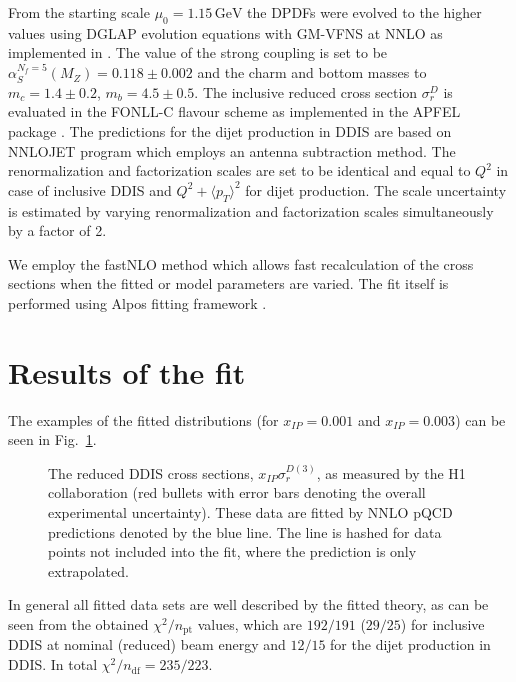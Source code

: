 \documentclass{PoS}
\newcommand{\IP}{I\!\!P}
\newcommand{\GeV}{\ensuremath{\mathrm{GeV}}\xspace}
\newcommand{\includegraphicss}[2][]{\fbox{\texttt{[image: \#2]}}}
\begin{document}
From the starting scale $\mu_0 = 1.15\,\GeV$ the DPDFs were evolved to the higher values using DGLAP evolution equations with GM-VFNS at NNLO as implemented in \cite{Botje:2010ay,Bertone:2013vaa}.
The value of the strong coupling is set to be $\alpha_S^{N_f = 5} (M_Z) = 0.118\pm 0.002$ and the charm and bottom masses to $m_c = 1.4\pm 0.2$, $m_b = 4.5\pm 0.5$.
The inclusive reduced cross section $\sigma_r^D$ is evaluated in the FONLL-C flavour scheme \cite{Cacciari:1998it} as implemented in the APFEL package \cite{Bertone:2013vaa}.
The predictions for the dijet production in DDIS are based on NNLOJET program \cite{Currie:2016ytq} which employs an antenna subtraction method.
The renormalization and factorization scales are set to be identical and equal to $Q^2$ in case of inclusive DDIS and $Q^2 + \langle p_T\rangle^2$ for dijet production.
The scale uncertainty is estimated by varying renormalization and factorization scales simultaneously by a factor of 2.

We employ the fastNLO method \cite{Britzger:2012bs} which allows fast recalculation of the cross sections when the fitted or model parameters are varied.
The fit itself is performed using Alpos fitting framework \cite{yyy}.

\section{Results of the fit}

The examples of the fitted distributions (for $x_{\IP} = 0.001$ and $x_{\IP} = 0.003$) can be seen in Fig.~\ref{figDDISfit}.
\begin{figure}[h]
\centering
\begin{minipage}[t]{0.47\textwidth}
\includegraphicss[trim={0cm 0.0cm 0 0.0cm},clip,width=.9\textwidth]{{{plots/H1prelim-19-013.fig11}}}
\end{minipage}
\begin{minipage}[t]{0.47\textwidth}
\includegraphicss[trim={0cm 1.2cm 0 1.1cm},clip,width=.9\textwidth]{{{plots/H1prelim-19-013.fig10}}}
\end{minipage}
\caption{The reduced DDIS cross sections, $x_{\IP}\sigma_r^{D(3)}$, as measured by the H1 collaboration (red bullets with error bars denoting the overall experimental uncertainty). These data are fitted by NNLO pQCD predictions denoted by the blue line. The line is hashed for data points not included into the fit, where the prediction is only extrapolated.}
\label{figDDISfit}
\end{figure}
In general all fitted data sets are well described by the fitted theory, as can be seen from the obtained $\chi^2/n_\mathrm{pt}$ values, which are $192/191$ ($29/25$) for inclusive DDIS at nominal (reduced) beam energy and $12/15$ for the dijet production in DDIS.
In total $\chi^2/n_\mathrm{df} = 235/223$.
\end{document}
